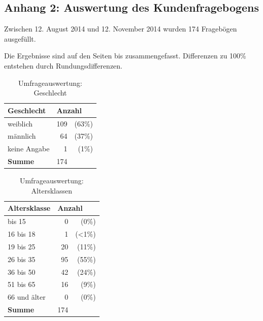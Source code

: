 \newpage
\subsection*{Anhang 2: Auswertung des Kundenfragebogens}

Zwischen 12. August 2014 und 12. November 2014 wurden 174 Fragebögen ausgefüllt. 

Die Ergebnisse sind auf den Seiten \pageref{tab:geschlecht} bis \pageref{tab:usability} zusammengefasst. Differenzen zu 100\% entstehen durch Rundungsdifferenzen.

\begin{table}[H]
\begin{center}
\begin{footnotesize}
\begin{tabular}{| l | r  r |}  \hline                       
  \textbf{Geschlecht}              & \multicolumn{2}{|l|}{\textbf{Anzahl}}   \\ \hline 
  weiblich        &  109 &   (63\%)  \\  \hline  
  männlich        &  64  &   (37\%)  \\  \hline  
  keine Angabe    &  1   &   (1\%)  \\  \hline  
  \textbf{Summe}  & 174  &   \\  \hline  
\end{tabular}
\end{footnotesize}
\caption{Umfrageauswertung: Geschlecht}
\label{tab:geschlecht}
\end{center}
\end{table}

\begin{table}[H]
\begin{center}
\begin{footnotesize}
\begin{tabular}{| l | r  r |}  \hline                       
  \textbf{Altersklasse}              & \multicolumn{2}{|l|}{\textbf{Anzahl}}   \\ \hline 
  bis 15          &  0 &   (0\%)  \\  \hline  
  16 bis 18       &  1 &   (<1\%)  \\  \hline  
  19 bis 25       & 20  &   (11\%)  \\  \hline  
  26 bis 35       & 95  &   (55\%)  \\  \hline  
  36 bis 50       & 42  &   (24\%)  \\  \hline  
  51 bis 65       & 16  &   (9\%)  \\  \hline  
  66 und älter    & 0  &   (0\%)  \\  \hline  
  \textbf{Summe}  & 174  &   \\  \hline  
\end{tabular}
\end{footnotesize}
\caption{Umfrageauswertung: Altersklassen}
\label{tab:altersklassen}
\end{center}
\end{table}


